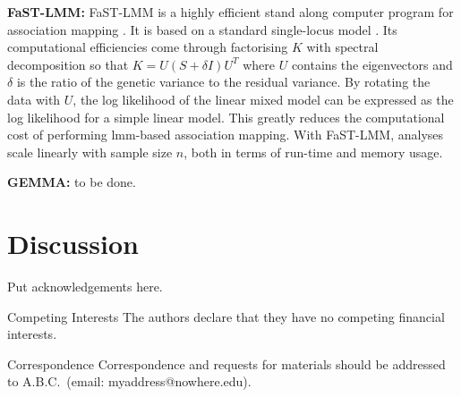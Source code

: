 \documentclass{nature}
\begin{document}
\textbf{FaST-LMM:}  FaST-LMM is a highly efficient stand along computer program for association 
mapping \cite{lippert2011fast}. It is based on a standard single-locus model 
\cite{yu2006unified,zhao2007arabidopsis}. Its computational efficiencies come through factorising $K$ with spectral decomposition so that $K=U (S + \delta I) U^T$ where $U$ contains the eigenvectors and $\delta$ is the ratio of the genetic variance to the residual variance. 
By rotating the data with $U$, the log likelihood of the linear mixed model can be expressed as the log likelihood for a simple 
linear model.  This greatly reduces the computational cost of performing lmm-based  association mapping. With FaST-LMM, 
analyses scale linearly with sample size $n$, both in terms of run-time and memory usage.

\textbf{GEMMA:}  to be done. 

\section{Discussion}
















\begin{addendum}
 \item Put acknowledgements here.
 \item[Competing Interests] The authors declare that they have no
competing financial interests.
 \item[Correspondence] Correspondence and requests for materials
should be addressed to A.B.C.~(email: myaddress@nowhere.edu).
\end{addendum}
\end{document}
